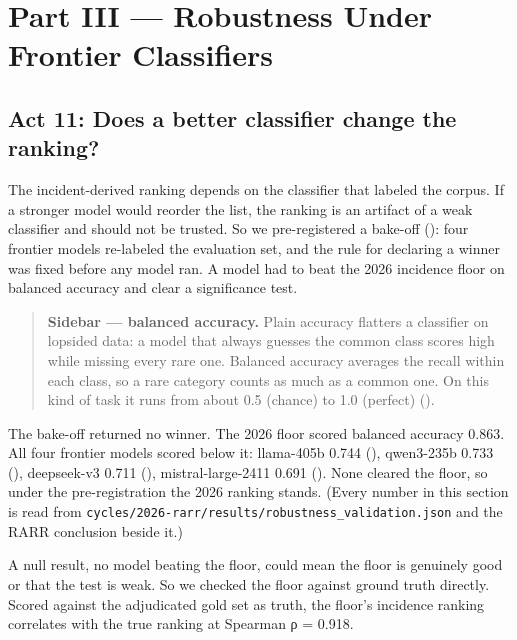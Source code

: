 \documentclass[11pt]{article}
\begin{document}
\section{Part III --- Robustness Under Frontier
Classifiers}\label{part-iii-robustness-under-frontier-classifiers}

\subsection{Act 11: Does a better classifier change the
ranking?}\label{act-11-does-a-better-classifier-change-the-ranking}

The incident-derived ranking depends on the classifier that labeled the
corpus. If a stronger model would reorder the list, the ranking is an
artifact of a weak classifier and should not be trusted. So we
pre-registered a bake-off ():
four frontier models re-labeled the evaluation set, and the rule for
declaring a winner was fixed before any model ran. A model had to beat
the 2026 incidence floor on balanced accuracy and clear a significance
test.

\begin{quote}
\textbf{Sidebar --- balanced accuracy.} Plain accuracy flatters a
classifier on lopsided data: a model that always guesses the common
class scores high while missing every rare one. Balanced accuracy
averages the recall within each class, so a rare category counts as much
as a common one. On this kind of task it runs from about 0.5 (chance) to
1.0 (perfect) ().
\end{quote}

The bake-off returned no winner. The 2026 floor scored balanced accuracy
0.863. All four frontier models scored below it: llama-405b 0.744
(), qwen3-235b 0.733
(), deepseek-v3 0.711
(), mistral-large-2411 0.691
(). None cleared the
floor, so under the pre-registration the 2026 ranking stands. (Every
number in this section is read from
\texttt{cycles/2026-rarr/results/robustness\_validation.json} and the
RARR conclusion beside it.)

A null result, no model beating the floor, could mean the floor is
genuinely good or that the test is weak. So we checked the floor against
ground truth directly. Scored against the adjudicated gold set as truth,
the floor's incidence ranking correlates with the true ranking at
Spearman ρ = 0.918.
\end{document}
